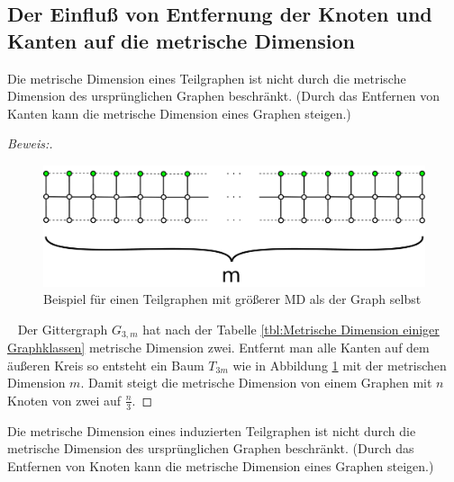 \subsection{Der Einfluß von Entfernung der Knoten und Kanten auf die metrische Dimension}
\begin{lem}
Die metrische Dimension eines Teilgraphen ist nicht durch die metrische Dimension des ursprünglichen Graphen beschränkt. (Durch das Entfernen von Kanten kann die metrische Dimension eines Graphen steigen.)
\end{lem}
\begin{proof}[Beweis:]$\;$
\begin{figure}[h!]
		\centering 		 
\includegraphics[width=420pt]{bilder/gitterzubaum.pdf}
   \caption{Beispiel für einen Teilgraphen mit größerer MD als der Graph selbst}
   \label{bild:Gitterbaum1}
\end{figure}
~ \linebreak
Der Gittergraph $G_{3,m}$ hat nach der Tabelle \ref{tbl:Metrische Dimension einiger Graphklassen} metrische Dimension zwei. Entfernt man alle Kanten auf dem äußeren Kreis so entsteht ein Baum $T_{3m}$ wie in Abbildung \ref{bild:Gitterbaum1} mit der metrischen Dimension $m$. Damit steigt die metrische Dimension von einem Graphen mit $n$ Knoten von zwei auf $\frac{n}{3}$.
\end{proof}
\begin{lem}
Die metrische Dimension eines induzierten Teilgraphen ist nicht durch die metrische Dimension des ursprünglichen Graphen beschränkt. (Durch das Entfernen von Knoten kann die metrische Dimension eines Graphen steigen.)
\end{lem}
